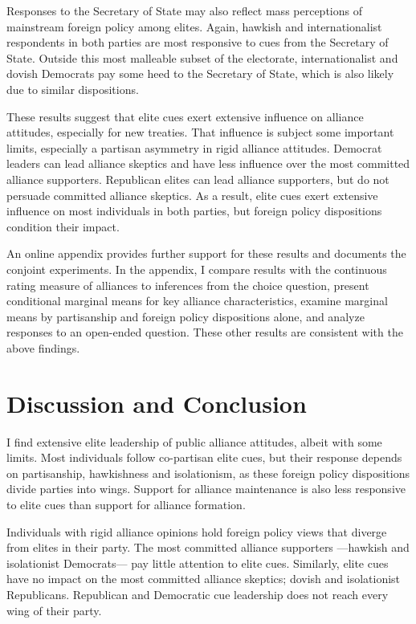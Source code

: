 \documentclass[12pt]{article}
\begin{document}
Responses to the Secretary of State may also reflect mass perceptions of mainstream foreign policy among elites.
Again, hawkish and internationalist respondents in both parties are most responsive to cues from the Secretary of State.
Outside this most malleable subset of the electorate, internationalist and dovish Democrats pay some heed to the Secretary of State, which is also likely due to similar dispositions.


These results suggest that elite cues exert extensive influence on alliance attitudes, especially for new treaties.
That influence is subject some important limits, especially a partisan asymmetry in rigid alliance attitudes. 
Democrat leaders can lead alliance skeptics and have less influence over the most committed alliance supporters. 
Republican elites can lead alliance supporters, but do not persuade committed alliance skeptics. 
As a result, elite cues exert extensive influence on most individuals in both parties, but foreign policy dispositions condition their impact. 


An online appendix provides further support for these results and documents the conjoint experiments. 
In the appendix, I compare results with the continuous rating measure of alliances to inferences from the choice question, present conditional marginal means for key alliance characteristics, examine marginal means by partisanship and foreign policy dispositions alone, and analyze responses to an open-ended question. 
These other results are consistent with the above findings. 


\section{Discussion and Conclusion} 


I find extensive elite leadership of public alliance attitudes, albeit with some limits.  
Most individuals follow co-partisan elite cues, but their response depends on partisanship, hawkishness and isolationism, as these foreign policy dispositions divide parties into wings.
Support for alliance maintenance is also less responsive to elite cues than support for alliance formation. 


Individuals with rigid alliance opinions hold foreign policy views that diverge from elites in their party.  
The most committed alliance supporters ---hawkish and isolationist Democrats--- pay little attention to elite cues.
Similarly, elite cues have no impact on the most committed alliance skeptics; dovish and isolationist Republicans. 
Republican and Democratic cue leadership does not reach every wing of their party. 
\end{document}
